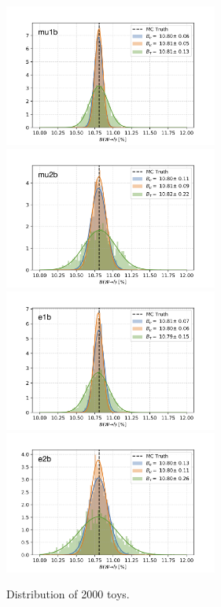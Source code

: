 \begin{figure}[ht]
    \centering
    \includegraphics[width=7cm]{chapters/Analysis/sectionStatisticalAnalysis/figures/test_mu1b.png}
    \includegraphics[width=7cm]{chapters/Analysis/sectionStatisticalAnalysis/figures/test_mu2b.png}
    \includegraphics[width=7cm]{chapters/Analysis/sectionStatisticalAnalysis/figures/test_e1b.png}
    \includegraphics[width=7cm]{chapters/Analysis/sectionStatisticalAnalysis/figures/test_e2b.png}
    
    \caption{ Distribution of 2000 toys. }
    \label{fig:test_toy}
\end{figure}


